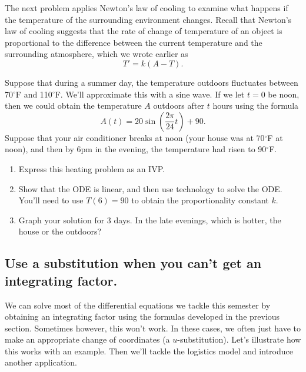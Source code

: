 The next problem applies Newton's law of cooling to examine what happens if the temperature of the surrounding environment changes. Recall that Newton's law of cooling suggests that the rate of change of temperature of an object is proportional to the difference between the current temperature and the surrounding atmosphere, which we wrote earlier as $$T'=k(A-T).$$
\begin{problem}
 Suppose that during a summer day, the temperature outdoors fluctuates between 70$^\circ$F and 110$^\circ$F.  We'll approximate this with a sine wave. If we let $t=0$ be noon, then we could obtain the temperature $A$ outdoors after $t$ hours using the formula 
$$A(t) = 20\sin(\frac{2\pi}{24} t)+90.$$ Suppose that your air conditioner breaks at noon (your house was at 70$^\circ$F at noon), and then by 6pm in the evening, the temperature had risen to 90$^\circ$F.
\begin{enumerate}
 \item Express this heating problem as an IVP.
 \item Show that the ODE is linear, and then use technology to solve the ODE. You'll need to use $T(6)=90$ to obtain the proportionality constant $k$. 
 \item Graph your solution for 3 days. In the late evenings, which is hotter, the house or the outdoors?  
\end{enumerate}
\end{problem}


\subsection{Use a substitution when you can't get an integrating factor.}
We can solve most of the differential equations we tackle this semester by obtaining an integrating factor using the formulas developed in the previous section.  Sometimes however, this won't work. In these cases, we often just have to make an appropriate change of coordinates (a $u$-substitution). Let's illustrate how this works with an example.  Then we'll tackle the logistics model and introduce another application. 

